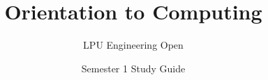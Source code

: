 \documentclass[a4paper,11pt,oneside,openany]{book}
\title{Orientation to Computing}
\author{LPU Engineering Open}
\date{Semester 1 Study Guide}
\begin{document}
\frontmatter

\makebookcover
\copyrightpage
\disclaimerpage

\tableofcontents
\newpage

\mainmatter







\end{document}
